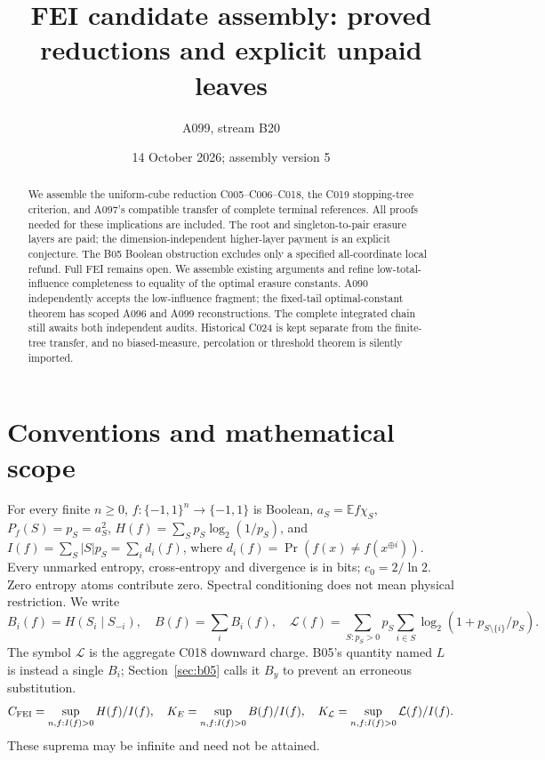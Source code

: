 \documentclass[11pt]{article}
\title{FEI candidate assembly: proved reductions and explicit unpaid leaves}
\author{A099, stream B20}
\date{14 October 2026; assembly version 5}
\newcommand{\E}{\mathbb E}
\begin{document}
\maketitle
\begin{abstract}
We assemble the uniform-cube reduction C005--C006--C018, the
C019 stopping-tree criterion, and A097's compatible transfer of complete
terminal references. All proofs needed for these implications are included.
The root and singleton-to-pair erasure layers are paid; the
dimension-independent higher-layer payment is an explicit conjecture.
The B05 Boolean obstruction excludes only a specified all-coordinate local
refund. Full FEI remains open. We assemble existing arguments and refine
low-total-influence completeness to equality of the optimal erasure constants.
A090 independently accepts the low-influence fragment; the fixed-tail
optimal-constant theorem has scoped A096 and A099 reconstructions.
The complete integrated chain still awaits both independent audits.
Historical C024 is kept separate from the
finite-tree transfer, and no biased-measure, percolation or threshold theorem
is silently imported.
\end{abstract}

\section{Conventions and mathematical scope}
For every finite $n\ge0$, $f:\{-1,1\}^n\to\{-1,1\}$ is Boolean,
$a_S=\E f\chi_S$, $P_f(S)=p_S=a_S^2$,
$H(f)=\sum_Sp_S\log_2(1/p_S)$, and
$I(f)=\sum_S|S|p_S=\sum_i d_i(f)$, where
$d_i(f)=\Pr(f(x)\ne f(x^{\oplus i}))$.
Every unmarked entropy, cross-entropy and divergence is in bits;
$c_0=2/\ln2$. Zero entropy atoms contribute zero. Spectral conditioning
does not mean physical restriction. We write
\[
 B_i(f)=H(S_i\mid S_{-i}),\quad B(f)=\sum_i B_i(f),\quad
 \mathcal L(f)=\sum_{S:p_S>0}p_S\sum_{i\in S}
                    \log_2(1+p_{S\setminus\{i\}}/p_S).
\]
The symbol $\mathcal L$ is the aggregate C018 downward charge. B05's
quantity named $L$ is instead a single $B_i$; Section~\ref{sec:b05}
calls it $B_y$ to prevent an erroneous substitution.
\[
C_{\rm FEI}=\sup_{n,f:I(f)>0} H(f)/I(f),\quad
K_E=\sup_{n,f:I(f)>0} B(f)/I(f),\quad
K_{\mathcal L}=\sup_{n,f:I(f)>0}\mathcal L(f)/I(f).
\]
These suprema may be infinite and need not be attained.
\end{document}
